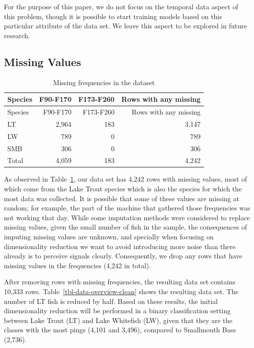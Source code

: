 \documentclass[
  letterpaper,
  DIV=11,
  numbers=noendperiod]{scrartcl}
\begin{document}
For the purpose of this paper, we do not focus on the temporal data
aspect of this problem, though it is possible to start training models
based on this particular attribute of the data set. We leave this aspect
to be explored in future research.

\hypertarget{missing-values}{%
\subsection{Missing Values}\label{missing-values}}

\hypertarget{tbl-missing-values}{}
\begin{longtable}[]{@{}lrrr@{}}
\caption{\label{tbl-missing-values}Missing frequencies in the
dataset}\tabularnewline
\toprule\noalign{}
Species & F90-F170 & F173-F260 & Rows with any missing \\
\midrule\noalign{}
\endfirsthead
\toprule\noalign{}
Species & F90-F170 & F173-F260 & Rows with any missing \\
\midrule\noalign{}
\endhead
\bottomrule\noalign{}
\endlastfoot
LT & 2,964 & 183 & 3,147 \\
LW & 789 & 0 & 789 \\
SMB & 306 & 0 & 306 \\
Total & 4,059 & 183 & 4,242 \\
\end{longtable}

As observed in Table~\ref{tbl-missing-values}, our data set has 4,242
rows with missing values, most of which come from the Lake Trout species
which is also the species for which the most data was collected. It is
possible that some of these values are missing at random; for example,
the part of the machine that gathered those frequencies was not working
that day. While some imputation methods were considered to replace
missing values, given the small number of fish in the sample, the
consequences of imputing missing values are unknown, and specially when
focusing on dimensionality reduction we want to avoid introducing more
noise than there already is to perceive signals clearly. Consequently,
we drop any rows that have missing values in the frequencies (4,242 in
total).

After removing rows with missing frequencies, the resulting data set
contains 10,333 rows. Table~\ref{tbl-data-overview-clean} shows the
resulting data set. The number of LT fish is reduced by half. Based on
these results, the initial dimensionality reduction will be performed in
a binary classification setting between Lake Trout (LT) and Lake
Whitefish (LW), given that they are the classes with the most pings
(4,101 and 3,496), compared to Smallmouth Bass (2,736).
\end{document}
